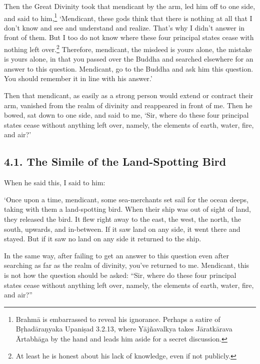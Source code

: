 \documentclass[12pt,openany]{book}%
\begin{document}
Then the Great Divinity took that mendicant by the arm, led him off to one side, and said to him,\footnote{\textsanskrit{Brahmā} is embarrassed to reveal his ignorance. Perhaps a satire of \textsanskrit{Bṛhadāraṇyaka} \textsanskrit{Upaniṣad} 3.2.13, where \textsanskrit{Yājñavalkya} takes \textsanskrit{Jāratkārava} \textsanskrit{Ārtabhāga} by the hand and leads him aside for a secret discussion. } ‘Mendicant, these gods think that there is nothing at all that I don’t know and see and understand and realize. That’s why I didn’t answer in front of them. But I too do not know where these four principal states cease with nothing left over.\footnote{At least he is honest about his lack of knowledge, even if not publicly. } Therefore, mendicant, the misdeed is yours alone, the mistake is yours alone, in that you passed over the Buddha and searched elsewhere for an answer to this question. Mendicant, go to the Buddha and ask him this question. You should remember it in line with his answer.’ 

Then that mendicant, as easily as a strong person would extend or contract their arm, vanished from the realm of divinity and reappeared in front of me. Then he bowed, sat down to one side, and said to me, ‘Sir, where do these four principal states cease without anything left over, namely, the elements of earth, water, fire, and air?’ 

\subsection*{4.1. The Simile of the Land-Spotting Bird }

When he said this, I said to him: 

‘Once upon a time, mendicant, some sea-merchants set sail for the ocean deeps, taking with them a land-spotting bird. When their ship was out of sight of land, they released the bird. It flew right away to the east, the west, the north, the south, upwards, and in-between. If it saw land on any side, it went there and stayed. But if it saw no land on any side it returned to the ship. 

In the same way, after failing to get an answer to this question even after searching as far as the realm of divinity, you’ve returned to me. Mendicant, this is not how the question should be asked: “Sir, where do these four principal states cease without anything left over, namely, the elements of earth, water, fire, and air?” 
\end{document}
